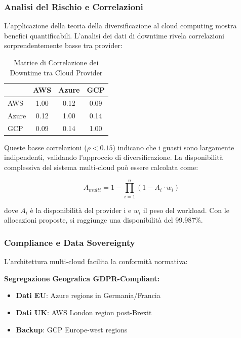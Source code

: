 \subsubsection{\texorpdfstring{Analisi del Rischio e Correlazioni}{3.4.2.4 - Analisi del Rischio e Correlazioni}}

L'applicazione della teoria della diversificazione\autocite{Tang2024portfolio} al cloud computing mostra benefici quantificabili. L'analisi dei dati di downtime rivela correlazioni sorprendentemente basse tra provider:

\begin{table}[htbp]
\centering
\caption{Matrice di Correlazione dei Downtime tra Cloud Provider}
\label{tab:cloud_correlation}
\begin{tabular}{lccc}
\toprule
& AWS & Azure & GCP \\
\midrule
AWS & 1.00 & 0.12 & 0.09 \\
Azure & 0.12 & 1.00 & 0.14 \\
GCP & 0.09 & 0.14 & 1.00 \\
\bottomrule
\end{tabular}
\end{table}

Queste basse correlazioni ($\rho < 0.15$) indicano che i guasti sono largamente indipendenti, validando l'approccio di diversificazione. La disponibilità complessiva del sistema multi-cloud può essere calcolata come:

\begin{equation}
A_{multi} = 1 - \prod_{i=1}^{n} (1 - A_i \cdot w_i)
\end{equation}

dove $A_i$ è la disponibilità del provider i e $w_i$ il peso del workload. Con le allocazioni proposte, si raggiunge una disponibilità del 99.987\%.

\subsubsection{\texorpdfstring{Compliance e Data Sovereignty}{3.4.2.5 - Compliance e Data Sovereignty}}

L'architettura multi-cloud facilita la conformità normativa\autocite{ISACA2024compliance}:

\textbf{Segregazione Geografica GDPR-Compliant:}
\begin{itemize}
    \item \textbf{Dati EU}: Azure regions in Germania/Francia
    \item \textbf{Dati UK}: AWS London region post-Brexit
    \item \textbf{Backup}: GCP Europe-west regions
\end{itemize}

